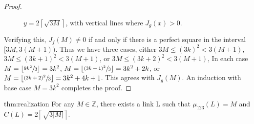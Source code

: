 \documentclass[11pt]{amsart}
\theoremstyle{remark}
\newcommand{\Z}{\mathbb{Z}}
\newcommand{\ceil}[1]{\left\lceil #1 \right\rceil}
\newcommand{\floor}[1]{\left\lfloor #1 \right\rfloor}
\begin{document}
\begin{proof}
\begin{figure}[htb]
\begin{tikzpicture}[scale=.3]
\end{tikzpicture}
\caption{$y=2\ceil{\sqrt{3M}}$, with vertical lines where $J_g(x)>0$.}\label{fig:graph}
\end{figure}

Verifying this, $J_f(M)\neq 0$ if and only if there is a perfect square in the interval $[3M,3(M+1))$.  Thus we have three cases, either $3M\le (3k)^2<3(M+1)$, $3M\le (3k+1)^2<3(M+1)$, or $3M\le (3k+2)^2<3(M+1)$, 
In each case $M=\floor{\sfrac{9k^2}{3}} = 3k^2$, 
$M=\floor{\sfrac{(3k+1)^2}{3}}=3k^2+2k$, 
or $M=\floor{\sfrac{(3k+2)^2}{3}} =3k^2+4k+1$.  This agrees with $J_g(M)$.  An induction with base case $M=3k^2$ completes the proof.\end{proof}

\begin{reptheorem}{thm:realization}
For any $M\in \Z$,  there exists a link L such that $\mu_{123}(L)=M$ and \(C(L)=2\ceil{\sqrt{3|M|}}.\) 
\end{reptheorem}
\end{document}
